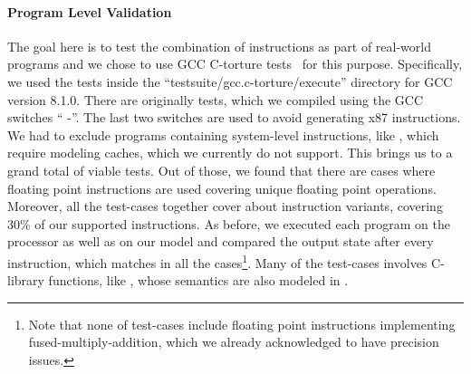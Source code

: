 \paragraph{Program Level Validation}
The goal here is to test the combination of instructions as part of real-world programs and we chose to use GCC C-torture tests~\cite{CTORTURE} for this purpose. Specifically, we used the tests inside the ``testsuite/gcc.c-torture/execute'' directory for GCC version 8.1.0.  
There are originally \TortureTotal{} tests, which we compiled using the GCC switches ``     -''. The last two switches are used to avoid generating x87 instructions. We had to exclude \TortureExclude{} programs containing system-level instructions, like , which require modeling caches, which we currently do not support. This brings us to a grand total of \TortureInclude{} viable tests. Out of those, we found that there are \TortureUifsInstr{} cases where floating point instructions are used covering \TortureUifs{} unique floating point operations. Moreover, all the test-cases together cover about \TortureCoverage{} instruction variants, covering  $30\%$ of our supported instructions. As before, we executed each program on the processor as well as  on our model and compared the output state after every instruction, which matches in all the cases\footnote{Note that none of test-cases include floating point instructions implementing fused-multiply-addition, which we already acknowledged to have precision issues.}. Many of the test-cases involves C-library functions, like , whose semantics are also modeled in \K.


